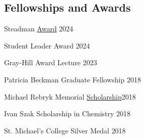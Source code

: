 \documentclass[margin,line]{res}
\newenvironment{list2}{
  \begin{list}{$\bullet$}{%
      \setlength{\itemsep}{0in}
      \setlength{\parsep}{0in} \setlength{\parskip}{0in}
      \setlength{\topsep}{0in} \setlength{\partopsep}{0in} 
      \setlength{\leftmargin}{0.2in}}}{\end{list}}
\begin{document}
\begin{resume}
%






\section{\sc Fellowships  \newline and Awards}
Steadman \href{https://www.rochester.edu/college/gradstudies/postdocs/steadman-awards.html}{Award} \hfill{2024}

\vspace*{-2.5mm}

Student Leader Award \hfill {2024}

\vspace*{-2.5mm}

Gray-Hill Award Lecture \hfill{2023}

\vspace*{-2.5mm}

Patricia Beckman Graduate Fellowship \hfill {2018}

\vspace*{-2.5mm}

Michael Rebryk Memorial  \href{http://ucu-building-community.blogspot.ca/2016/03/ucu-adds-new-scholarships-in-2016.html}{Scholarship}\hfill {2018}

\vspace*{-2.5mm}

Ivan Szak Scholarship in Chemistry \hfill {2018}

\vspace*{-2.5mm}

St. Michael's College Silver Medal \hfill {2018} 


\end{resume}
\end{document}
